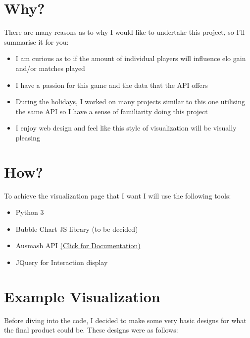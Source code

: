 \documentclass[11pt, oneside, a4paper]{article}
\begin{document}
\section*{Why?}
There are many reasons as to why I would like to undertake this project, so I'll summarise it for you:
\begin{itemize}
    \item I am curious as to if the amount of individual players will influence elo gain and/or matches played 
    \item I have a passion for this game and the data that the API offers
    \item During the holidays, I worked on many projects similar to this one utilising the same API so I have a sense of familiarity doing this project
    \item I enjoy web design and feel like this style of visualization will be visually pleasing 
\end{itemize}

\section*{How?}
To achieve the visualization page that I want I will use the following tools:
\begin{itemize}
    \item Python 3
    \item Bubble Chart JS library (to be decided)
    \item Ausmash API \href{https://api.ausmash.com.au/swagger/ui/index#/}{(Click for Documentation)}
    \item JQuery for Interaction display
\end{itemize}

\section*{Example Visualization}
Before diving into the code, I decided to make some very basic designs for what the final product could be. These designs were as follows:
\end{document}
